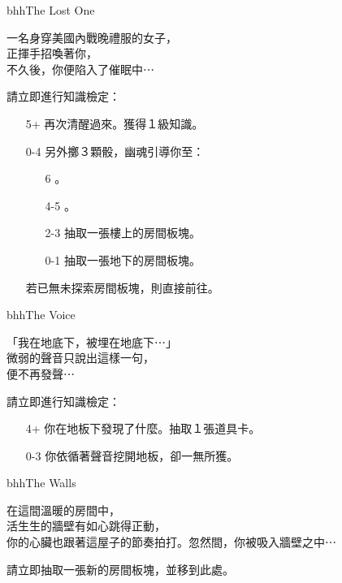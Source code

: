 \begin{EventCard}{bhh}{The Lost One}
  \begin{CardStory}
    一名身穿美國內戰晚禮服的女子，\\
    正揮手招喚著你，\\
    不久後，你便陷入了催眠中⋯
  \end{CardStory}
  \footnotesize
  請立即進行知識檢定：
  \begin{itemize}
    \item[5+] 再次清醒過來。獲得１級知識。
    \item[0-4] 另外擲３顆骰，幽魂引導你至：
      \begin{itemize}
        \item[6] 。
        \item[4-5] 。
        \item[2-3] 抽取一張樓上的房間板塊。
        \item[0-1] 抽取一張地下的房間板塊。
      \end{itemize}
      若已無未探索房間板塊，則直接前往。
  \end{itemize}
\end{EventCard}%
\linebreak[0]%
\begin{EventCard}{bhh}{The Voice}
  \begin{CardStory}
    「我在地底下，被埋在地底下⋯」\\
    微弱的聲音只說出這樣一句，\\
    便不再發聲⋯
  \end{CardStory}
  請立即進行知識檢定：
  \begin{itemize}
    \item[4+] 你在地板下發現了什麼。抽取１張道具卡。
    \item[0-3] 你依循著聲音挖開地板，卻一無所獲。
  \end{itemize}
\end{EventCard}%
\linebreak[0]%
\begin{EventCard}{bhh}{The Walls}
  \begin{CardStory}
    在這間溫暖的房間中，\\
    活生生的牆壁有如心跳得正動，\\
    你的心臟也跟著這屋子的節奏拍打。忽然間，你被吸入牆壁之中⋯
  \end{CardStory}
  請立即抽取一張新的房間板塊，並移到此處。\smallbreak
\end{EventCard}%
